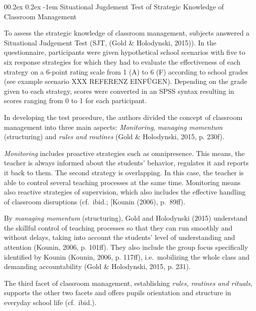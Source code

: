 \documentclass[
  man]{apa6}
\makeatletter
\let\oldparagraph\paragraph
\renewcommand{\paragraph}[1]{\oldparagraph{#1}\mbox{}}
\renewcommand{\paragraph}{\@startsection{paragraph}{4}{\parindent}%
  {0\baselineskip \@plus 0.2ex \@minus 0.2ex}%
  {-1em}%
  {\normalfont\normalsize\bfseries\itshape\typesectitle}}
\makeatother
\begin{document}
\hypertarget{situational-jugdement-test-of-strategic-knowledge-of-classroom-management}{%
\paragraph{Situational Jugdement Test of Strategic Knowledge of Classroom Management}\label{situational-jugdement-test-of-strategic-knowledge-of-classroom-management}}

To assess the strategic knowledge of classroom management, subjects answered a Situational Judgement Test (SJT, (Gold \& Holodynski, 2015)). In the questionnaire, participants were given hypothetical school scenarios with five to six response strategies for which they had to evaluate the effectiveness of each strategy on a 6-point rating scale from 1 (A) to 6 (F) according to school grades (see example scenario XXX REFERENZ EINFÜGEN). Depending on the grade given to each strategy, scores were converted in an SPSS syntax resulting in scores ranging from 0 to 1 for each participant.

In developing the test procedure, the authors divided the concept of classroom management into three main aspects: \emph{Monitoring}, \emph{managing momentum} (structuring) and \emph{rules and routines} (Gold \& Holodynski, 2015, p. 230f).

\emph{Monitoring} includes proactive strategies such as omnipresence. This means, the teacher is always informed about the students' behavior, regulates it and reports it back to them. The second strategy is overlapping. In this case, the teacher is able to control several teaching processes at the same time. Monitoring means also reactive strategies of supervision, which also includes the effective handling of classroom disruptions (cf.~ibid.; {[}Kounin (2006), p.~89ff).

By \emph{managing momentum} (structuring), Gold and Holodynski (2015) understand the skillful control of teaching processes so that they can run smoothly and without delays, taking into account the students' level of understanding and attention (Kounin, 2006, p. 101ff). They also include the group focus specifically identified by Kounin (Kounin, 2006, p. 117ff), i.e.~mobilizing the whole class and demanding accountability (Gold \& Holodynski, 2015, p. 231).

The third facet of classroom management, establishing \emph{rules, routines and rituals}, supports the other two facets and offers pupils orientation and structure in everyday school life (cf.~ibid.).
\end{document}
